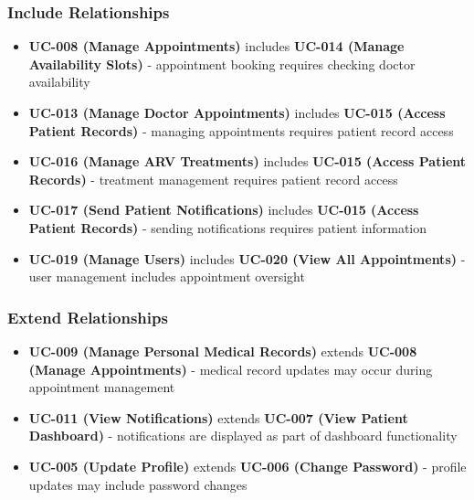 \documentclass[12pt,a4paper]{article}
\begin{document}
\subsubsection{Include Relationships}
\begin{itemize}
    \item \textbf{UC-008 (Manage Appointments)} includes \textbf{UC-014 (Manage Availability Slots)} - appointment booking requires checking doctor availability
    \item \textbf{UC-013 (Manage Doctor Appointments)} includes \textbf{UC-015 (Access Patient Records)} - managing appointments requires patient record access
    \item \textbf{UC-016 (Manage ARV Treatments)} includes \textbf{UC-015 (Access Patient Records)} - treatment management requires patient record access
    \item \textbf{UC-017 (Send Patient Notifications)} includes \textbf{UC-015 (Access Patient Records)} - sending notifications requires patient information
    \item \textbf{UC-019 (Manage Users)} includes \textbf{UC-020 (View All Appointments)} - user management includes appointment oversight
\end{itemize}

\subsubsection{Extend Relationships}
\begin{itemize}
    \item \textbf{UC-009 (Manage Personal Medical Records)} extends \textbf{UC-008 (Manage Appointments)} - medical record updates may occur during appointment management
    \item \textbf{UC-011 (View Notifications)} extends \textbf{UC-007 (View Patient Dashboard)} - notifications are displayed as part of dashboard functionality
    \item \textbf{UC-005 (Update Profile)} extends \textbf{UC-006 (Change Password)} - profile updates may include password changes
\end{itemize}
\end{document}
